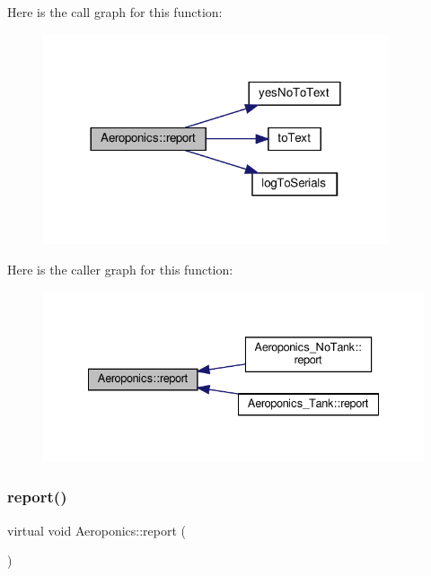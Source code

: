 Here is the call graph for this function\+:
\nopagebreak
\begin{figure}[H]
\begin{center}
\leavevmode
\includegraphics[width=288pt]{class_aeroponics_a3dbfce027ab5fa736a6007a6ae75ee4e_cgraph}
\end{center}
\end{figure}
Here is the caller graph for this function\+:
\nopagebreak
\begin{figure}[H]
\begin{center}
\leavevmode
\includegraphics[width=335pt]{class_aeroponics_a3dbfce027ab5fa736a6007a6ae75ee4e_icgraph}
\end{center}
\end{figure}
\mbox{\label{class_aeroponics_a1da64fbd59c3452422fdaaf794dfa8be}} 
\subsubsection{\texorpdfstring{report()}{report()}\hspace{0.1cm}{\footnotesize\ttfamily [2/2]}}
{\footnotesize\ttfamily virtual void Aeroponics\+::report (\begin{DoxyParamCaption}{ }\end{DoxyParamCaption})\hspace{0.3cm}{\ttfamily [virtual]}}




